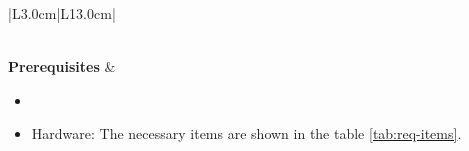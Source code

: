 \begin{table}[H]
\begin{tabular}{|L{3.0cm}|L{13.0cm}|}
\begin{minipage}[t]{\linewidth}
\begin{itemize}[nosep,after=\strut]
				\end{itemize}
			\end{minipage}\\\hline
			\textbf{Prerequisites} & 
			\begin{minipage}[t]{\linewidth}
				\begin{itemize}[nosep,after=\strut]
					\item \preReqPro
					\item Hardware: The necessary items are shown in the table \ref{tab:req-items}.
				\end{itemize} 
			\end{minipage}\\\hline
		\end{tabular}
	\caption{Procedure \subprocid{} description. } \label{tb:ewctxfilter}
\end{table}


